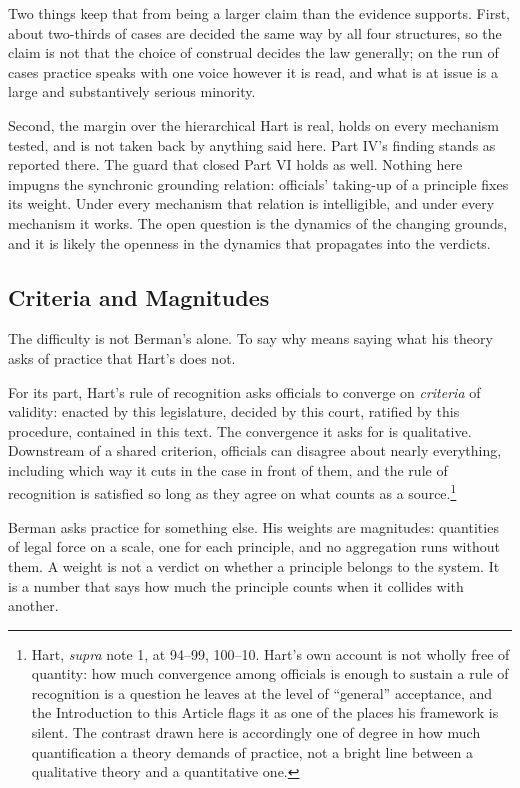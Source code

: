 Two things keep that from being a larger claim than the evidence supports.
First, about two-thirds of cases are decided the same way by all four
structures, so the claim is not that the choice of construal decides the
law generally; on the run of cases practice speaks with one voice however
it is read, and what is at issue is a large and substantively serious
minority. 

Second, the margin over the hierarchical Hart is real, holds on every
mechanism tested, and is not taken back by anything said here. Part IV's finding
stands as reported there. The guard that closed Part VI holds as
well. Nothing here impugns the synchronic grounding relation: officials'
taking-up of a principle fixes its weight. Under every mechanism that relation
is intelligible, and under every mechanism it works. The open question is the
dynamics of the changing grounds, and it is likely the openness in the
dynamics that propagates into the verdicts.

\subsection{Criteria and Magnitudes}

The difficulty is not Berman's alone. To say why means saying what his theory asks of practice that Hart's does
not.

For its part, Hart's rule of recognition asks officials to converge on
\textit{criteria} of validity: enacted by this legislature, decided by this court, ratified
by this procedure, contained in this text. The convergence it asks for is qualitative. Downstream of a shared
criterion, officials can disagree about nearly everything, including which
way it cuts in the case in front of them, and the rule of recognition is
satisfied so long as they agree on what counts as a source.\footnote{Hart, \textit{supra}
note 1, at 94--99, 100--10. Hart's own account is not wholly free of
quantity: how much convergence among officials is enough to sustain a
rule of recognition is a question he leaves at the level of ``general''
acceptance, and the Introduction to this Article flags it as one of the
places his framework is silent. The contrast drawn here is accordingly
one of degree in how much quantification a theory demands of practice,
not a bright line between a qualitative theory and a quantitative one.}

Berman asks practice for something else. His weights are magnitudes:
quantities of legal force on a scale, one for each principle, and no
aggregation runs without them. A weight is not a verdict on whether a principle belongs to the system. It
is a number that says how much the principle counts when it collides with
another. 

